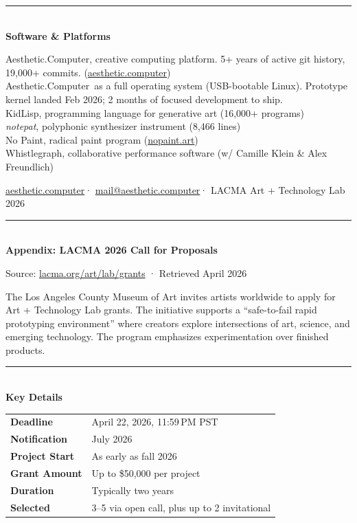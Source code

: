 \documentclass[12pt,letterpaper]{article}
\newcommand{\ac}{Aesthetic{\color{acpink}.}Computer}
\newcommand{\achead}[1]{%
  \vspace{1.6em}%
  {\color{acpink}\noindent\rule{\textwidth}{1.5pt}}\\[0.4em]
  {\large\bfseries #1}%
  \vspace{0.4em}%
}
\newcommand{\acsubhead}[1]{%
  \vspace{1em}%
  {\color{acgray}\noindent\rule{4cm}{0.5pt}}\\[0.3em]
  {\bfseries #1}%
  \vspace{0.3em}%
}
\newcommand{\cvline}[2]{\noindent\makebox[3.2em][l]{\color{acgray}#1}#2\\[0.15em]}
\begin{document}
\acsubhead{Software \& Platforms}

\cvline{2021--}{\ac{}, creative computing platform. 5+ years of active git history, 19,000+ commits. (\href{https://aesthetic.computer}{aesthetic.computer})}
\cvline{2026--}{\ac{}\ as a full operating system (USB-bootable Linux). Prototype kernel landed Feb 2026; 2 months of focused development to ship.}
\cvline{2024--}{KidLisp, programming language for generative art (16,000+ programs)}
\cvline{2024--}{\textit{notepat}, polyphonic synthesizer instrument (8,466 lines)}
\cvline{2016--}{No Paint, radical paint program (\href{https://nopaint.art}{nopaint.art})}
\cvline{2016--}{Whistlegraph, collaborative performance software (w/ Camille Klein \& Alex Freundlich)}

\vfill
\begin{center}
  \color{acgray}
  \href{https://aesthetic.computer}{aesthetic.computer}\enspace·\enspace
  \href{mailto:mail@aesthetic.computer}{mail@aesthetic.computer}\enspace·\enspace
  LACMA Art + Technology Lab 2026
\end{center}

\newpage
\achead{Appendix: LACMA 2026 Call for Proposals}

\begin{center}
  {\color{acgray}\small Source: \href{https://www.lacma.org/art/lab/grants}{lacma.org/art/lab/grants} · Retrieved April 2026}
\end{center}

\vspace{0.5em}

The Los Angeles County Museum of Art invites artists worldwide to apply for Art + Technology Lab grants. The initiative supports a ``safe-to-fail rapid prototyping environment'' where creators explore intersections of art, science, and emerging technology. The program emphasizes experimentation over finished products.

\acsubhead{Key Details}

\begin{tabularx}{\textwidth}{@{}lX@{}}
  \textbf{Deadline} & April 22, 2026, 11:59\,PM PST \\
  \textbf{Notification} & July 2026 \\
  \textbf{Project Start} & As early as fall 2026 \\
  \textbf{Grant Amount} & Up to \$50,000 per project \\
  \textbf{Duration} & Typically two years \\
  \textbf{Selected} & 3--5 via open call, plus up to 2 invitational \\
\end{tabularx}
\end{document}
